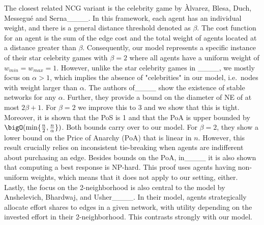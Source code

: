 The closest related NCG variant is the celebrity game by {\`A}lvarez, Blesa, Duch, Messegu{\'e} and Serna____.
In this framework, each agent has an individual weight, and there is a general distance threshold denoted as $\beta$. The cost function for an agent is the sum of the edge cost and the total weight of agents located at a distance greater than $\beta$. Consequently, our model represents a specific instance of their star celebrity games with $\beta=2$ where all agents have a uniform weight of $w_{min}=w_{max}=1$. However, unlike the star celebrity games in ____, we mostly focus on $\alpha > 1$, which implies the absence of "celebrities" in our model, i.e.\ nodes with weight larger than $\alpha$.
The authors of____ show the existence of stable networks for any $\alpha$. Further, they provide a bound on the diameter of NE of at most $2\beta+1$. For $\beta=2$ we improve this to $3$ and we show that this is tight. Moreover, it is shown that the PoS is 1 and that the PoA is upper bounded by $\bigO(\min\{\frac{n}{2},\frac{n}{\alpha}\})$. Both bounds carry over to our model. 
For $\beta=2$, they show a lower bound on the Price of Anarchy (PoA) that is linear in $n$. However, this result crucially relies on inconsistent tie-breaking when agents are indifferent about purchasing an edge. 
Besides bounds on the PoA, in____ it is also shown that computing a best response is NP-hard. This proof uses agents having non-uniform weights, which means that it does not apply to our setting, either.
Lastly, the focus on the 2-neighborhood is also central to the model by Anshelevich, Bhardwaj, and Usher____. In their model, agents strategically allocate effort shares to edges in a given network, with utility depending on the invested effort in their 2-neighborhood. This contrasts strongly with our model.